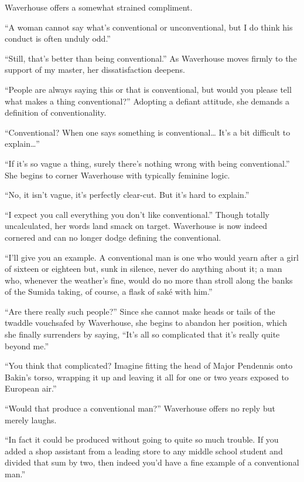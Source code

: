 \documentclass{book}
\begin{document}
Waverhouse offers a somewhat strained compliment.

``A woman cannot say what's conventional or unconventional, but I do
think his conduct is often unduly odd.''

``Still, that's better than being conventional.'' As Waverhouse moves
firmly to the support of my master, her dissatisfaction deepens.

``People are always saying this or that is conventional, but would you
please tell what makes a thing conventional?'' Adopting a defiant
attitude, she demands a definition of conventionality.

``Conventional? When one says something is conventional\ldots{} It's a
bit difficult to explain\ldots{}''

``If it's so vague a thing, surely there's nothing wrong with being
conventional.'' She begins to corner Waverhouse with typically feminine
logic.

``No, it isn't vague, it's perfectly clear-cut. But it's hard to
explain.''

``I expect you call everything you don't like conventional.'' Though
totally uncalculated, her words land smack on target. Waverhouse is now
indeed cornered and can no longer dodge defining the conventional.

``I'll give you an example. A conventional man is one who would yearn
after a girl of sixteen or eighteen but, sunk in silence, never do
anything about it; a man who, whenever the weather's fine, would do no
more than stroll along the banks of the Sumida taking, of course, a
flask of saké with him.''

``Are there really such people?'' Since she cannot make heads or tails
of the twaddle vouchsafed by Waverhouse, she begins to abandon her
position, which she finally surrenders by saying, ``It's all so
complicated that it's really quite beyond me.''

``You think that complicated? Imagine fitting the head of Major
Pendennis onto Bakin's torso, wrapping it up and leaving it all for one
or two years exposed to European air.''

``Would that produce a conventional man?'' Waverhouse offers no reply
but merely laughs.

``In fact it could be produced without going to quite so much trouble.
If you added a shop assistant from a leading store to any middle school
student and divided that sum by two, then indeed you'd have a fine
example of a conventional man.''
\end{document}
